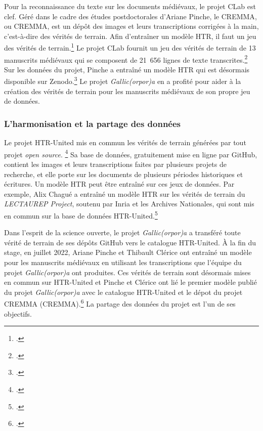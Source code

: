 \documentclass[class=article, crop=false]{standalone}
\begin{document}
Pour la reconnaissance du texte sur les documents médiévaux, le projet \Gls{CLab} est clef. Géré dans le cadre des études postdoctorales d'Ariane Pinche, le \acrlong{CREMMA}, ou \acrshort{CREMMA}, est un dépôt des images et leurs transcriptions corrigées à la main, c'est-à-dire des vérités de terrain. Afin d'entraîner un modèle \acrshort{HTR}, il faut un jeu des vérités de terrain.\footcite{chagueHTRUnitedMutualisonsVerite2021} Le projet \Gls{CLab} fournit un jeu des vérités de terrain de 13 manuscrits médiévaux qui se composent de 21~656 lignes de texte transcrites.\footcite{pincheCremmaLabProjectTranscription2022} Sur les données du projet, Pinche a entraîné un modèle \acrshort{HTR} qui est désormais disponible sur Zenodo.\footcite{pincheHTRModelCremma2022} Le projet \textit{Gallic(orpor)a} en a profité pour aider à la création des vérités de terrain pour les manuscrits médiévaux de son propre jeu de données.

\subsubsection{L'harmonisation et la partage des données}
Le projet \Gls{HTR-United} mis en commun les vérités de terrain générées par tout projet \textit{open source}. \footcite{chagueHTRUnitedHtrunitedV02022} Sa base de données, gratuitement mise en ligne par GitHub, contient les images et leurs transcriptions faites par plusieurs projets de recherche, et elle porte sur les documents de plusieurs périodes historiques et écritures. Un modèle \acrshort{HTR} peut être entraîné sur ces jeux de données. Par exemple, Alix Chagué a entraîné un modèle \acrshort{HTR} sur les vérités de terrain du \textit{LECTAUREP Project}, soutenu par \Gls{Inria} et les Archives Nationales, qui sont mis en commun sur la base de données \Gls{HTR-United}.\footcite{chagueLECTAUREPContemporaryFrench2022}

Dans l'esprit de la science ouverte, le projet \textit{Gallic(orpor)a} a transféré toute vérité de terrain de ses dépôts GitHub vers le catalogue \Gls{HTR-United}. À la fin du stage, en juillet 2022, Ariane Pinche et Thibault Clérice ont entraîné un modèle pour les manuscrits médiévaux en utilisant les transcriptions que l'équipe du projet \textit{Gallic(orpor)a} ont produites. Ces vérités de terrain sont désormais mises en commun sur \Gls{HTR-United} et Pinche et Clérice ont lié le premier modèle publié du projet \textit{Gallic(orpor)a} avec le catalogue \Gls{HTR-United} et le dépot du projet \acrshort{CREMMA} (\acrlong{CREMMA}).\footcite{pincheHTRUnitedCremmamedievalCortado2022} La partage des données du projet est l'un de ses objectifs.
\end{document}
